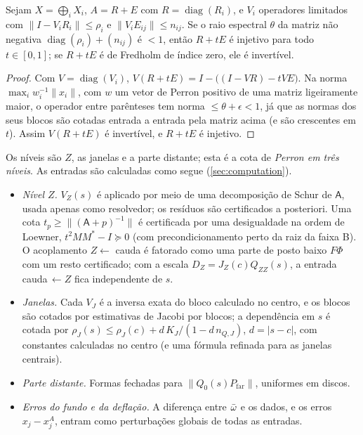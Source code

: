 \begin{lemma}\label{lem:perron}
Sejam $X=\bigoplus_iX_i$, $A=R+E$ com $R=\operatorname{diag}(R_i)$, e $V_i$ operadores limitados com
$\|I-V_iR_i\|\le\rho_i$ e $\|V_iE_{ij}\|\le n_{ij}$. Se o raio espectral $\theta$ da matriz não negativa
$\operatorname{diag}(\rho_i)+(n_{ij})$ é $<1$, então $R+tE$ é injetivo para todo $t\in[0,1]$; se $R+tE$ é de Fredholm de
índice zero, ele é invertível.
\end{lemma}

\begin{proof}
Com $V=\operatorname{diag}(V_i)$, $V(R+tE)=I-\big((I-VR)-tVE\big)$. Na norma
$\max_iw_i^{-1}\|x_i\|$, com $w$ um vetor de Perron positivo de uma matriz ligeiramente maior, o operador entre
parênteses tem norma $\le\theta+\epsilon<1$, já que as normas dos seus blocos são cotadas entrada a entrada pela matriz acima
(e são crescentes em $t$). Assim $V(R+tE)$ é invertível, e $R+tE$ é injetivo.
\end{proof}

Os níveis são $Z$, as janelas e a parte distante; esta é a cota de \emph{Perron em três níveis}. As entradas são
calculadas como segue (\cref{sec:computation}).
\begin{itemize}[leftmargin=*]
\item \emph{Nível $Z$.} $V_Z(s)$ é aplicado por meio de uma decomposição de Schur de $\mathsf A$, usada
  apenas como resolvedor; os resíduos são certificados a posteriori. Uma cota $t_p\ge\|(\mathsf A+p)^{-1}\|$ é certificada por uma desigualdade na ordem de Loewner, $t^2MM^*-I\succeq0$ (com precondicionamento perto da
  raiz da faixa B). O acoplamento $Z\leftarrow$ cauda é fatorado como uma parte de posto baixo $F\Phi$ com um resto
  certificado; com a escala $D_Z=J_Z(c)Q_{ZZ}(s)$, a entrada cauda$\,\leftarrow Z$ fica independente de $s$.
\item \emph{Janelas.} Cada $V_J$ é a inversa exata do bloco calculado no centro, e os blocos são
  cotados por estimativas de Jacobi por blocos; a dependência em $s$ é cotada por $\rho_J(s)\le\rho_J(c)+d\,K_J/(1-d\,n_{Q,J})$,
  $d=|s-c|$, com constantes calculadas no centro (e uma fórmula refinada para as janelas centrais).
\item \emph{Parte distante.} Formas fechadas para $\|Q_0(s)P_{\mathrm{far}}\|$, uniformes em discos.
\item \emph{Erros do fundo e da deflação.} A diferença entre $\bar\omega$ e os dados, e os erros
  $x_j-x_j^A$, entram como perturbações globais de todas as entradas.
\end{itemize}

